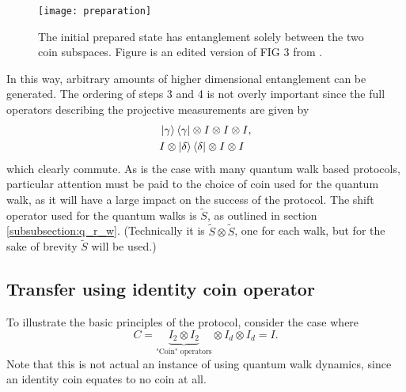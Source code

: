 \begin{figure}
    \centering
    \texttt{[image: preparation]}
    \caption{The initial prepared state has entanglement solely between the two coin subspaces. Figure is an edited version of FIG 3 from \cite{giordani2020}.}
    \label{fig:preparation}
\end{figure}
In this way, arbitrary amounts of higher dimensional entanglement can be generated.\newline
The ordering of steps 3 and 4 is not overly important since the full operators describing the projective measurements are given by
\begin{align}
    &\ket{\gamma}\bra{\gamma} \otimes I \otimes I \otimes I,\\
    &I \otimes \ket{\delta}\bra{\delta} \otimes I \otimes I
\end{align}
which clearly commute.
As is the case with many quantum walk based protocols, particular attention must be paid to the choice of coin used for the quantum walk, as it will have a large impact on the success of the protocol.
The shift operator used for the quantum walks is $\tilde{S}$, as outlined in section \ref{subsubsection:q_r_w}.
(Technically it is $\tilde{S}\otimes\tilde{S}$, one for each walk, but for the sake of brevity $\tilde{S}$ will be used.)

\subsection{Transfer using identity coin operator}
\label{subsection:qw_transfer}
To illustrate the basic principles of the protocol, consider the case where 
\begin{equation}
    C = \underbrace{I_2 \otimes I_2}_{\text{"Coin" operators}} \otimes I_d \otimes I_d = I.
\end{equation}
Note that this is not actual an instance of using quantum walk dynamics, since an identity coin equates to no coin at all.


